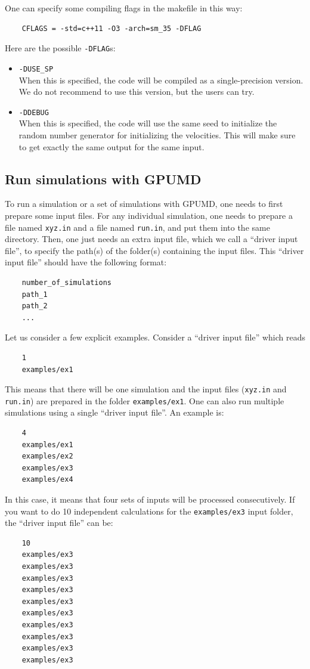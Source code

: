\documentclass[12pt,a4paper]{report}
\begin{document}
One can specify some compiling flags in the makefile in this way:
\begin{verbatim}
    CFLAGS = -std=c++11 -O3 -arch=sm_35 -DFLAG
\end{verbatim}
Here are the possible \verb"-DFLAG"s:
\begin{itemize}
\item \verb"-DUSE_SP"\\
When this is specified, the code will be compiled as a single-precision version. We do not recommend to use this version, but the users can try.
\item \verb"-DDEBUG"\\
When this is specified, the code will use the same seed to initialize the random number generator for initializing the velocities. This will make sure to get exactly the same output for the same input.
\end{itemize}


\subsection{Run simulations with GPUMD}

To run a simulation or a set of simulations with GPUMD, one needs to first prepare some input files. For any individual simulation, one needs to prepare a file named \verb"xyz.in" and a file named \verb"run.in", and put them into the same directory. Then, one just needs an extra input file, which we call a ``driver input file'', to specify the path(s) of the folder(s) containing the input files. This ``driver input file'' should have the following format:
\begin{verbatim}
    number_of_simulations
    path_1
    path_2
    ...
\end{verbatim}


Let us consider a few explicit examples. Consider a ``driver input file'' which reads
\begin{verbatim}
    1
    examples/ex1
\end{verbatim}
This means that there will be one simulation and the input files (\verb"xyz.in" and \verb"run.in") are prepared in the folder \verb"examples/ex1". One can also run multiple simulations using a single ``driver input file''. An example is:
\begin{verbatim}
    4
    examples/ex1
    examples/ex2
    examples/ex3
    examples/ex4
\end{verbatim}
In this case, it means that four sets of inputs will be processed consecutively. If you want to do 10 independent calculations for the \verb"examples/ex3" input folder, the ``driver input file'' can be:
\begin{verbatim}
    10
    examples/ex3
    examples/ex3
    examples/ex3
    examples/ex3
    examples/ex3
    examples/ex3
    examples/ex3
    examples/ex3
    examples/ex3
    examples/ex3
\end{verbatim}
\end{document}
